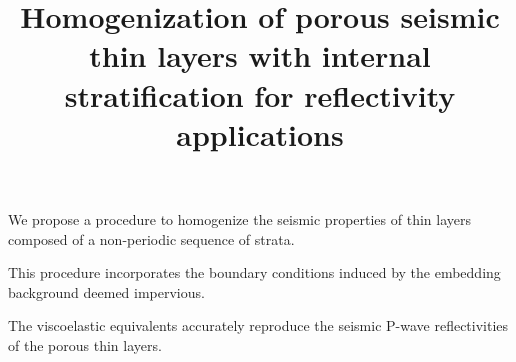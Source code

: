 \documentclass[draft]{agujournal2019}
\begin{document}

\title{Homogenization of porous seismic thin layers with internal stratification for reflectivity applications}
%
%






\begin{keypoints}
\item We propose a procedure to homogenize the seismic properties of thin layers composed of a non-periodic sequence of strata.
\item This procedure incorporates the boundary conditions induced by the embedding  background deemed impervious.
\item The viscoelastic equivalents accurately reproduce the seismic P-wave reflectivities of the porous thin layers.

\end{keypoints}

\end{document}
